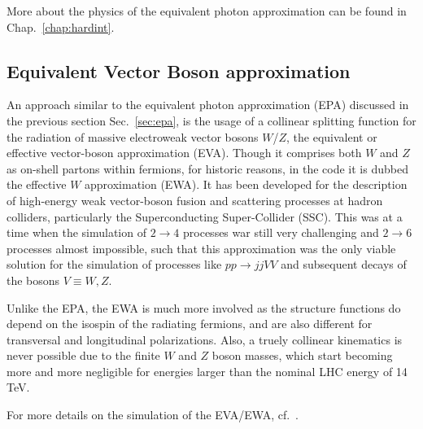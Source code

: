 \documentclass[12pt]{book}
\begin{document}
More about the physics of the equivalent photon approximation can be
found in Chap.~\ref{chap:hardint}.


\subsection{Equivalent Vector Boson approximation}
\label{sec:ewa}

An approach similar to the equivalent photon approximation (EPA)
discussed in the previous section Sec.~\ref{sec:epa}, is the usage
of a collinear splitting function for the radiation of massive
electroweak vector bosons $W$/$Z$, the equivalent or effective
vector-boson approximation (EVA). Though it comprises both $W$ and $Z$
as on-shell partons within fermions, for historic reasons, in the code
it is dubbed the effective $W$ approximation
(EWA). It has been developed for the
description of high-energy weak vector-boson fusion and scattering
processes at hadron colliders, particularly the Superconducting
Super-Collider (SSC). This was at a time when the simulation of $2\to
4$ processes war still very challenging and $2\to 6$ processes almost
impossible, such that this approximation was the only viable solution
for the simulation of processes like $pp \to jjVV$ and subsequent
decays of the bosons $V \equiv W, Z$.

Unlike the EPA, the EWA is much more involved as the structure
functions do depend on the isospin of the radiating fermions, and are
also different for transversal and longitudinal polarizations. Also, a
truely collinear kinematics is never possible due to the finite $W$
and $Z$ boson masses, which start becoming more and more negligible
for energies larger than the nominal LHC energy of 14 TeV.

For more details on the simulation of the EVA/EWA,
cf.~\cite{Dahlen:2025udl}. 
\end{document}
